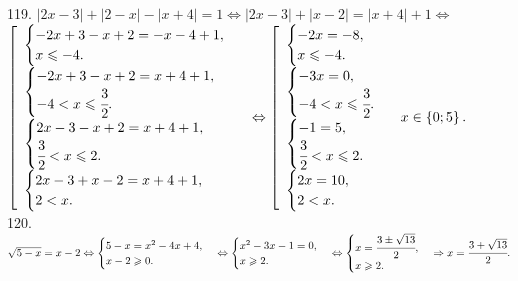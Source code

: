 119. $|2x-3|+|2-x|-|x+4|=1\Leftrightarrow |2x-3|+|x-2|=|x+4|+1\Leftrightarrow$\\$ \left[\begin{array}{l}\begin{cases} -2x+3-x+2=-x-4+1,\\ x\leqslant-4.\end{cases}\\
\begin{cases} -2x+3-x+2=x+4+1,\\ -4<x\leqslant\cfrac{3}{2}.\end{cases}\\ \begin{cases} 2x-3-x+2=x+4+1,\\ \cfrac{3}{2}<x\leqslant2.\end{cases}\\
\begin{cases} 2x-3+x-2=x+4+1,\\ 2< x.\end{cases}\end{array}\right.\Leftrightarrow \left[\begin{array}{l}\begin{cases} -2x=-8,\\ x\leqslant-4.\end{cases}\\
\begin{cases} -3x=0,\\ -4<x\leqslant\cfrac{3}{2}.\end{cases}\\ \begin{cases} -1=5,\\ \cfrac{3}{2}<x\leqslant2.\end{cases}\\
\begin{cases} 2x=10,\\ 2< x.\end{cases}\end{array}\right.
x\in\left\{0;5\right\}.$\\
120. $\sqrt{5-x}=x-2\Leftrightarrow\begin{cases} 5-x=x^2-4x+4,\\ x-2\geqslant0.\end{cases}\Leftrightarrow\begin{cases} x^2-3x-1=0,\\ x\geqslant2.\end{cases}\Leftrightarrow\begin{cases} x=\cfrac{3\pm\sqrt{13}}{2},\\ x\geqslant2.\end{cases}\Rightarrow x=\cfrac{3+\sqrt{13}}{2}.$\\
